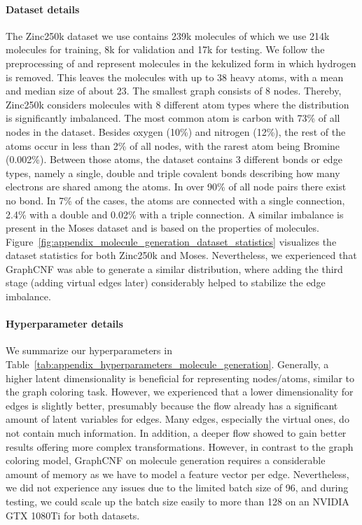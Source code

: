 \paragraph{Dataset details} The Zinc250k \cite{Zinc250k} dataset we use contains 239k molecules of which we use 214k molecules for training, 8k for validation and 17k for testing. We follow the preprocessing of \citet{GraphAF} and represent molecules in the kekulized form in which hydrogen is removed. This leaves the molecules with up to 38 heavy atoms, with a mean and median size of about 23.  The smallest graph consists of 8 nodes. Thereby, Zinc250k considers molecules with 8 different atom types where the distribution is significantly imbalanced. The most common atom is carbon with 73\% of all nodes in the dataset. Besides oxygen (10\%) and nitrogen (12\%), the rest of the atoms occur in less than 2\% of all nodes, with the rarest atom being Bromine (0.002\%). Between those atoms, the dataset contains 3 different bonds or edge types, namely a single, double and triple covalent bonds describing how many electrons are shared among the atoms. In over 90\% of all node pairs there exist no bond. In 7\% of the cases, the atoms are connected with a single connection, 2.4\% with a double and 0.02\% with a triple connection. A similar imbalance is present in the Moses dataset and is based on the properties of molecules. Figure~\ref{fig:appendix_molecule_generation_dataset_statistics} visualizes the dataset statistics for both Zinc250k and Moses. Nevertheless, we experienced that GraphCNF was able to generate a similar distribution, where adding the third stage (adding virtual edges later) considerably helped to stabilize the edge imbalance. 



\paragraph{Hyperparameter details} We summarize our hyperparameters in Table~\ref{tab:appendix_hyperparameters_molecule_generation}. Generally, a higher latent dimensionality is beneficial for representing nodes/atoms, similar to the graph coloring task. However, we experienced that a lower dimensionality for edges is slightly better, presumably because the flow already has a significant amount of latent variables for edges. Many edges, especially the virtual ones, do not contain much information.
In addition, a deeper flow showed to gain better results offering more complex transformations. However, in contrast to the graph coloring model, GraphCNF on molecule generation requires a considerable amount of memory as we have to model a feature vector per edge. Nevertheless, we did not experience any issues due to the limited batch size of 96, and during testing, we could scale up the batch size easily to more than 128 on an NVIDIA GTX 1080Ti for both datasets. 


